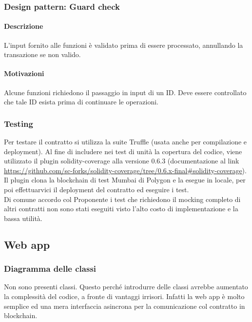 \documentclass[a4paper, 12pt]{article}
\begin{document}
\subsubsection{Design pattern: Guard check}
\paragraph{Descrizione}
L'input fornito alle funzioni è validato prima di essere processato, annullando la transazione se non valido.
\paragraph{Motivazioni}
Alcune funzioni richiedono il passaggio in input di un ID.
Deve essere controllato che tale ID esista prima di continuare le operazioni.

\subsubsection{Testing}
Per testare il contratto si utilizza la suite Truffle (usata anche per compilazione e deployment).
Al fine di includere nei test di unità la copertura del codice, viene utilizzato il plugin solidity-coverage alla versione 0.6.3 (documentazione al link \href{https://github.com/sc-forks/solidity-coverage/tree/0.6.x-final#solidity-coverage}{https://github.com/sc-forks/solidity-coverage/tree/0.6.x-final\#solidity-coverage}).\\
Il plugin clona la blockchain di test Mumbai di Polygon e la esegue in locale, per poi effettuarvici il deployment del contratto ed eseguire i test.\\
Di comune accordo col Proponente i test che richiedono il mocking completo di altri contratti non sono stati eseguiti visto l'alto costo di implementazione e la bassa utilità.

\newpage
\subsection{Web app}
\subsubsection{Diagramma delle classi}
Non sono presenti classi. Questo perché introdurre delle classi avrebbe aumentato la complessità del codice, a fronte di vantaggi irrisori. Infatti la web app è molto semplice ed una mera interfaccia asincrona per la comunicazione col contratto in blockchain.
\end{document}
